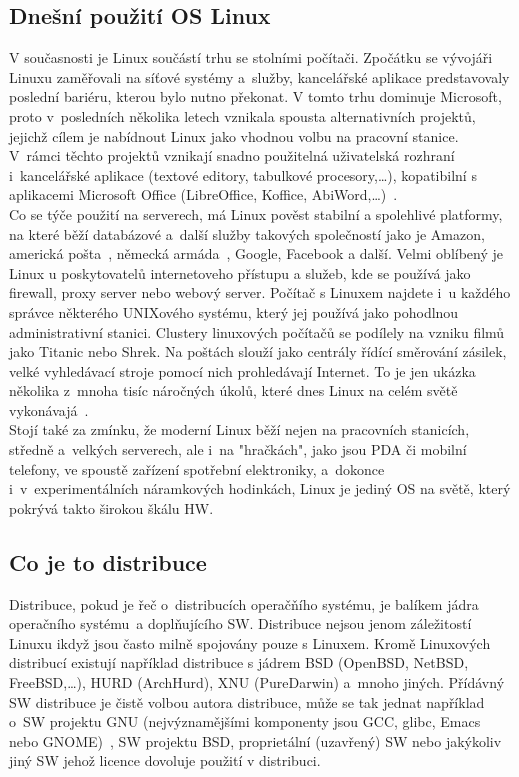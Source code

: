 \documentclass[a4paper,12pt]{article}
\begin{document}
\subsection{Dnešní použití OS Linux}
V současnosti je Linux součástí trhu se stolními počítači. Zpočátku se vývojáři Linuxu zaměřovali na síťové systémy a~služby, kancelářské aplikace predstavovaly poslední bariéru, kterou bylo nutno překonat. V tomto trhu dominuje Microsoft, proto v~posledních několika letech vznikala spousta alternativních projektů, jejichž cílem je nabídnout Linux jako vhodnou volbu na pracovní stanice. V~rámci těchto projektů vznikají snadno použitelná uživatelská rozhraní i~kancelářské aplikace (textové editory, tabulkové procesory,…), kopatibilní s aplikacemi Microsoft Office (LibreOffice, Koffice, AbiWord,…)~\cite{LDP}.\\
Co se týče použití na serverech, má Linux pověst stabilní a spolehlivé platformy, na které běží databázové a~další služby takových společností jako je Amazon, americká pošta~\cite{AmericanPostLinux}, německá armáda~\cite{GermanArmyNoLinux}, Google, Facebook a další. Velmi oblíbený je Linux u poskytovatelů internetoveho přístupu a služeb, kde se používá jako firewall, proxy server nebo webový server. Počítač s Linuxem najdete i~u každého správce některého UNIXového systému, který jej používá jako pohodlnou administrativní stanici. Clustery linuxových počítačů se podílely na vzniku filmů jako Titanic nebo Shrek. Na poštách slouží jako centrály řídící směrování zásilek, velké vyhledávací stroje pomocí nich prohledávají Internet. To je jen ukázka několika z~mnoha tisíc náročných úkolů, které dnes Linux na celém světě vykonávajá~\cite{LDP}.\\
Stojí také za zmínku, že moderní Linux běží nejen na pracovních stanicích, středně a~velkých serverech, ale i~na "hračkách", jako jsou PDA či mobilní telefony, ve spoustě zařízení spotřební elektroniky, a~dokonce i~v~experimentálních náramkových hodinkách, Linux je jediný OS na světě, který pokrývá takto širokou škálu HW.~\cite{LDP}

\subsection{Co je to distribuce}
Distribuce, pokud je řeč o~distribucích operačňího systému, je balíkem jádra operačního systému~a doplňujícího SW. Distribuce nejsou jenom záležitostí Linuxu ikdyž jsou často milně spojovány pouze s Linuxem. Kromě Linuxových distribucí existují například distribuce s jádrem BSD (OpenBSD, NetBSD, FreeBSD,…), HURD (ArchHurd), XNU (PureDarwin) a~mnoho jiných. Přídávný SW distribuce je čistě volbou autora distribuce, může se tak jednat například o~SW projektu GNU (nejvýznamějšími komponenty jsou GCC, glibc, Emacs nebo GNOME)~\cite{GNUweb}, SW projektu BSD, proprietální (uzavřený) SW nebo jakýkoliv jiný SW jehož licence dovoluje použití v distribuci.
\end{document}
